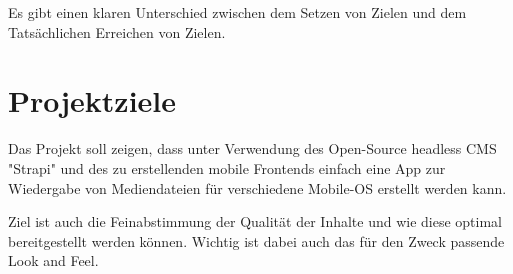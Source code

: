\begin{spacing}{1}
    
    Es gibt einen klaren Unterschied zwischen dem Setzen von Zielen und dem Tatsächlichen Erreichen von Zielen.
    

    \section{Projektziele}
    Das Projekt soll zeigen, dass unter Verwendung des Open-Source headless CMS "Strapi" und des zu erstellenden mobile
    Frontends einfach eine App zur Wiedergabe von Mediendateien für verschiedene Mobile-OS erstellt werden kann.

    Ziel ist auch die Feinabstimmung der Qualität der Inhalte und wie diese optimal bereitgestellt werden können. 
    Wichtig ist dabei auch das für den Zweck passende Look and Feel.


\end{spacing}